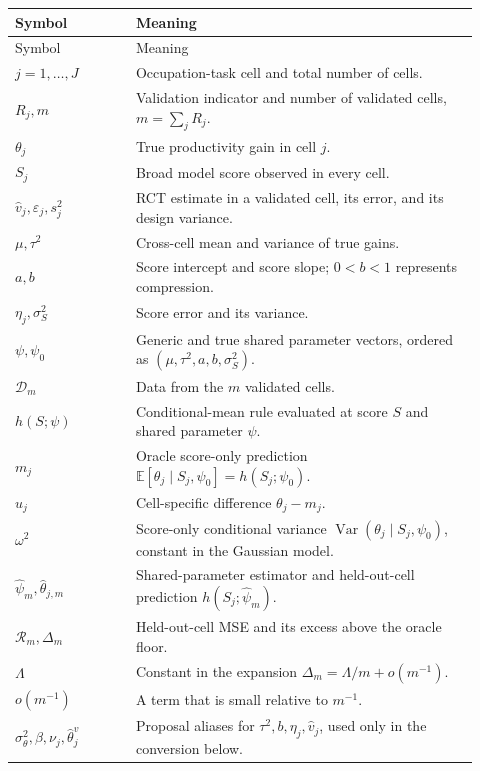 \documentclass[11pt]{article}
\newcommand{\E}{\mathbb E}
\newcommand{\Var}{\operatorname{Var}}
\begin{document}
\begin{longtable}{>{\raggedright\arraybackslash}p{0.24\linewidth}
                  >{\raggedright\arraybackslash}p{0.68\linewidth}}
\hline
Symbol & Meaning \\
\hline
\endfirsthead
\hline
Symbol & Meaning \\
\hline
\endhead
\(j=1,\ldots,J\) & Occupation-task cell and total number of cells. \\
\(R_j,m\) & Validation indicator and number of validated cells,
\(m=\sum_jR_j\). \\
\(\theta_j\) & True productivity gain in cell \(j\). \\
\(S_j\) & Broad model score observed in every cell. \\
\(\widehat v_j,\varepsilon_j,s_j^2\) & RCT estimate in a validated cell,
its error, and its design variance. \\
\(\mu,\tau^2\) & Cross-cell mean and variance of true gains. \\
\(a,b\) & Score intercept and score slope; \(0<b<1\) represents
compression. \\
\(\eta_j,\sigma_S^2\) & Score error and its variance. \\
\(\psi,\psi_0\) & Generic and true shared parameter vectors, ordered as
\((\mu,\tau^2,a,b,\sigma_S^2)\). \\
\(\mathcal D_m\) & Data from the \(m\) validated cells. \\
\(h(S;\psi)\) & Conditional-mean rule evaluated at score \(S\) and shared
parameter \(\psi\). \\
\(m_j\) & Oracle score-only prediction
\(\E[\theta_j\mid S_j,\psi_0]=h(S_j;\psi_0)\). \\
\(u_j\) & Cell-specific difference \(\theta_j-m_j\). \\
\(\omega^2\) & Score-only conditional variance
\(\Var(\theta_j\mid S_j,\psi_0)\), constant in the Gaussian model. \\
\(\widehat\psi_m,\widehat\theta_{j,m}\) & Shared-parameter estimator and
held-out-cell prediction \(h(S_j;\widehat\psi_m)\). \\
\(\mathcal R_m,\Delta_m\) & Held-out-cell MSE and its excess above the
oracle floor. \\
\(\Lambda\) & Constant in the expansion
\(\Delta_m=\Lambda/m+o(m^{-1})\). \\
\(o(m^{-1})\) & A term that is small relative to \(m^{-1}\). \\
\(\sigma_\theta^2,\beta,\nu_j,\widehat\theta_j^v\) & Proposal aliases for
\(\tau^2,b,\eta_j,\widehat v_j\), used only in the conversion below. \\
\hline
\end{longtable}
\end{document}
